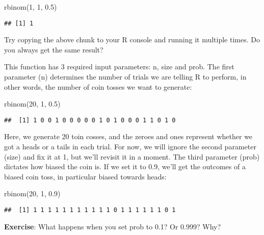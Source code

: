 \documentclass[
]{book}
\newenvironment{Shaded}{\begin{snugshade}}{\end{snugshade}}
\newcommand{\DecValTok}[1]{\textcolor[rgb]{0.00,0.00,0.81}{#1}}
\newcommand{\FloatTok}[1]{\textcolor[rgb]{0.00,0.00,0.81}{#1}}
\newcommand{\FunctionTok}[1]{\textcolor[rgb]{0.00,0.00,0.00}{#1}}
\newcommand{\NormalTok}[1]{#1}
\begin{document}
\begin{Shaded}
\begin{Highlighting}[]
\FunctionTok{rbinom}\NormalTok{(}\DecValTok{1}\NormalTok{, }\DecValTok{1}\NormalTok{, }\FloatTok{0.5}\NormalTok{)}
\end{Highlighting}
\end{Shaded}

\begin{verbatim}
## [1] 1
\end{verbatim}

Try copying the above chunk to your R console and running it multiple times. Do you always get the same result?

This function has 3 required input parameters: n, size and prob. The first parameter (n) determines the number of trials we are telling R to perform, in other words, the number of coin tosses we want to generate:

\begin{Shaded}
\begin{Highlighting}[]
\FunctionTok{rbinom}\NormalTok{(}\DecValTok{20}\NormalTok{, }\DecValTok{1}\NormalTok{, }\FloatTok{0.5}\NormalTok{)}
\end{Highlighting}
\end{Shaded}

\begin{verbatim}
##  [1] 1 0 0 1 0 0 0 0 0 1 0 1 0 0 0 1 1 0 1 0
\end{verbatim}

Here, we generate 20 toin cosses, and the zeroes and ones represent whether we got a heads or a tails in each trial. For now, we will ignore the second parameter (size) and fix it at 1, but we'll revisit it in a moment. The third parameter (prob) dictates how biased the coin is. If we set it to 0.9, we'll get the outcomes of a biased coin toss, in particular biased towards heads:

\begin{Shaded}
\begin{Highlighting}[]
\FunctionTok{rbinom}\NormalTok{(}\DecValTok{20}\NormalTok{, }\DecValTok{1}\NormalTok{, }\FloatTok{0.9}\NormalTok{)}
\end{Highlighting}
\end{Shaded}

\begin{verbatim}
##  [1] 1 1 1 1 1 1 1 1 1 1 1 0 1 1 1 1 1 1 0 1
\end{verbatim}

\textbf{Exercise}: What happens when you set prob to 0.1? Or 0.999? Why?
\end{document}
